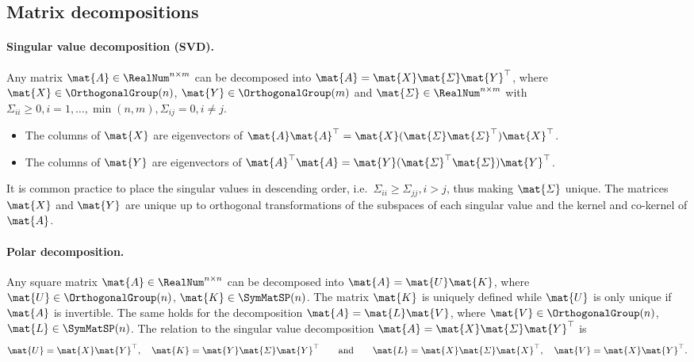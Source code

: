 \subsection{Matrix decompositions}
\paragraph{Singular value decomposition (SVD).}
Any matrix $\mat{A} \in \RealNum^{n\times m}$ can be decomposed into $\mat{A} = \mat{X} \mat{\varSigma} \mat{Y}^\top$, where $\mat{X} \in \OrthogonalGroup(n)$, $\mat{Y} \in \OrthogonalGroup(m)$ and $\mat{\varSigma} \in \RealNum^{n\times m}$ with $\varSigma_{ii} \geq 0, i=1,\ldots,\min(n,m), \varSigma_{ij} = 0, i\neq j$.
\begin{itemize}
 \item The columns of $\mat{X}$ are eigenvectors of $\mat{A} \mat{A}^\top = \mat{X} (\mat{\varSigma} \mat{\varSigma}^\top) \mat{X}^\top$.
 \item The columns of $\mat{Y}$ are eigenvectors of $\mat{A}^\top \mat{A} = \mat{Y} (\mat{\varSigma}^\top \mat{\varSigma}) \mat{Y}^\top$.
\end{itemize}
It is common practice to place the singular values in descending order, i.e.\ $\varSigma_{ii} \geq \varSigma_{jj}, i > j$, thus making $\mat{\varSigma}$ unique.
The matrices $\mat{X}$ and $\mat{Y}$ are unique up to orthogonal transformations of the subspaces of each singular value and the kernel and co-kernel of $\mat{A}$.

\paragraph{Polar decomposition.}
Any square matrix $\mat{A} \in \RealNum^{n\times n}$ can be decomposed into $\mat{A} = \mat{U} \mat{K}$, where $\mat{U} \in \OrthogonalGroup(n)$, $\mat{K} \in \SymMatSP(n)$.
The matrix $\mat{K}$ is uniquely defined while $\mat{U}$ is only unique if $\mat{A}$ is invertible.
The same holds for the decomposition $\mat{A} = \mat{L} \mat{V}$, where $\mat{V} \in \OrthogonalGroup(n)$, $\mat{L} \in \SymMatSP(n)$.
The relation to the singular value decomposition $\mat{A} = \mat{X} \mat{\varSigma} \mat{Y}^\top$ is
\begin{align}
 \mat{U} = \mat{X} \mat{Y}^\top, \quad \mat{K} = \mat{Y} \mat{\varSigma} \mat{Y}^\top
\qquad \text{and} \qquad
 \mat{L} = \mat{X} \mat{\varSigma} \mat{X}^\top, \quad \mat{V} = \mat{X} \mat{Y}^\top.
\end{align}

